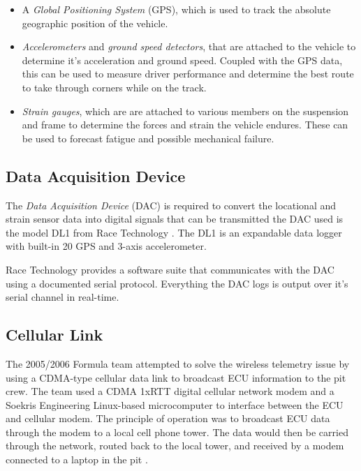 \begin{itemize}

\item A \emph{Global Positioning System} (GPS), which is used to track the absolute geographic position of the vehicle. 

\item \emph{Accelerometers} and \emph{ground speed detectors}, that are attached to the vehicle to determine it's acceleration and ground speed. Coupled with the GPS data, this can be used to measure driver performance and determine the best route to take through corners while on the track.

\item \emph{Strain gauges}, which are are attached to various members on the suspension and frame to determine the forces and strain the vehicle endures. These can be used to forecast fatigue and possible mechanical failure. 

\end{itemize}

\subsection{Data Acquisition Device}

The \emph{Data Acquisition Device} (DAC) is required to convert the locational and strain sensor data into digital signals that can be transmitted  the DAC used is the model DL1 from Race Technology \cite{DL1Dsheet}. The DL1 is an expandable data logger with built-in \unit{20}{\hertz} GPS and 3-axis accelerometer. 

Race Technology provides a software suite that communicates with the DAC using a documented serial protocol. Everything the DAC logs is output over it's serial channel in real-time.

\subsection{Cellular Link}

The 2005/2006 Formula team attempted to solve the wireless telemetry issue by using a CDMA-type cellular data link to broadcast ECU information to the pit crew. The team used a CDMA 1xRTT digital cellular network modem and a Soekris Engineering Linux-based microcomputer to interface between the ECU and cellular modem. The principle of operation was to broadcast ECU data through the modem to a local cell phone tower. The data would then be carried through the network, routed back to the local tower, and received by a modem connected to a laptop in the pit \cite{G26FinalRepo}.


